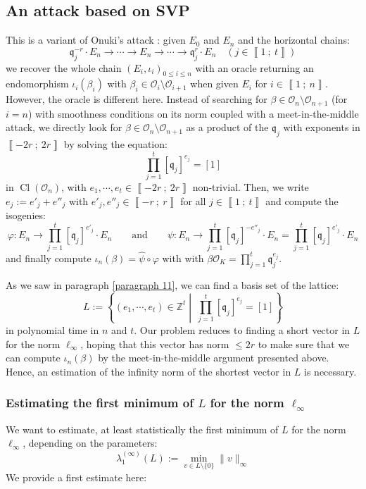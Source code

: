\documentclass[a4paper,10pt]{report}
\theoremstyle{definition}
\theoremstyle{plain}
\theoremstyle{definition}
\newcommand{\Z}{\mathbb{Z}}
\newcommand{\mO}{\mathcal{O}}
\renewcommand{\i}[2]{\left\llbracket #1~;~#2\right\rrbracket}
\renewcommand{\(}{\left(}
\renewcommand{\)}{\right)}
\newcommand{\mf}[1]{\mathfrak{#1}}
\DeclareMathOperator{\Cl}{Cl}
\begin{document}
\subsection{An attack based on SVP}\label{paragraph 9}

This is a variant of Onuki's attack : given $E_0$ and $E_n$ and the horizontal chains:
\[\mf{q}_j^{-r}\cdot E_n\longrightarrow \cdots \longrightarrow E_n\longrightarrow \cdots\longrightarrow \mf{q}_j^{r}\cdot E_n \quad (j\in\i{1}{t})\]
we recover the whole chain $(E_i,\iota_i)_{0\leq i\leq n}$ with an oracle returning an endomorphism $\iota_i(\beta_i)$ with $\beta_i\in\mO_i\setminus\mO_{i+1}$ when given $E_i$ for $i\in\i{1}{n}$. However, the oracle is different here.  Instead of searching for $\beta\in\mO_n\setminus\mO_{n+1}$ (for $i=n$) with smoothness conditions on its norm coupled with a meet-in-the-middle attack, we directly look for $\beta\in\mO_n\setminus\mO_{n+1}$ as a product of the $\mf{q}_j$ with exponents in $\i{-2r}{2r}$ by solving the equation:
\[\prod_{j=1}^t[\mf{q}_j]^{e_j}=[1]\]
in $\Cl(\mO_n)$, with $e_1,\cdots, e_t\in\i{-2r}{2r}$ non-trivial.  Then, we write $e_j:=e'_j+e''_j$ with $e'_j,e''_j\in\i{-r}{r}$ for all $j\in\i{1}{t}$ and compute the isogenies:
\[\varphi : E_n \longrightarrow \prod_{j=1}^t[\mf{q}_j]^{e'_j}\cdot E_n \qquad \mbox{and} \qquad \psi : E_n  \longrightarrow  \prod_{j=1}^t[\mf{q}_j]^{-e''_j}\cdot E_n=\prod_{j=1}^t[\mf{q}_j]^{e'_j}\cdot E_n\]
and finally compute $\iota_n(\beta)=\hat{\psi}\circ\varphi$ with with $\beta\mO_K= \prod_{j=1}^t\mf{q}_j^{e_j}$.

As we saw in paragraph \ref{paragraph 11}, we can find a basis set of the lattice:
\[L:=\left\{(e_1,\cdots,e_t)\in\Z^t\middle| \  \prod_{j=1}^t[\mf{q}_j]^{e_j}=[1]\right\}\]
in polynomial time in $n$ and $t$.  Our problem reduces to finding a short vector in $L$ for the norm $\ell_\infty$, hoping that this vector has norm $\leq 2r$ to make sure that we can compute $\iota_n(\beta)$ by the meet-in-the-middle argument presented above.  Hence,  an estimation of the infinity norm of the shortest vector in $L$ is necessary.

\subsubsection{Estimating the first minimum of $L$ for the norm $\ell_\infty$}

We want to estimate, at least statistically the first minimum of $L$ for the norm $\ell_\infty$, depending on the parameters:
\[\lambda_1^{(\infty)}(L):=\min_{v\in L\setminus\{0\}}\|v\|_\infty\]
We provide a first estimate here:
\end{document}
